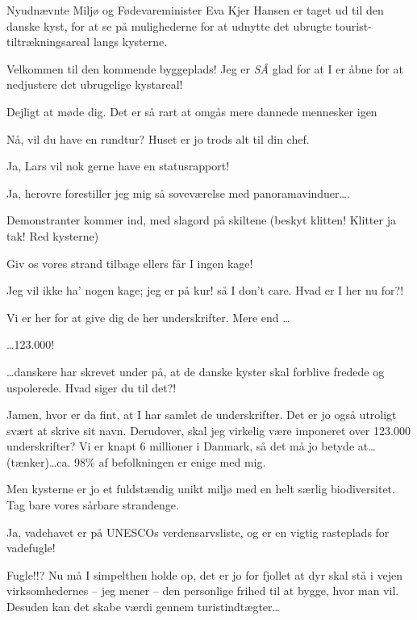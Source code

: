 \documentclass[a4paper,11pt]{article}
\begin{document}
\begin{sketch}


\scene Nyudnævnte Miljø og Fødevareminister Eva Kjer Hansen er taget ud til den danske kyst, for at se på mulighederne for at udnytte det ubrugte tourist-tiltrækningsareal langs kysterne.

 Velkommen til den kommende byggeplads! Jeg er \emph{SÅ} glad for at I er åbne for at nedjustere det ubrugelige kystareal!

 Dejligt at møde dig. Det er så rart at omgås mere dannede mennesker igen

 Nå, vil du have en rundtur? Huset er jo trods alt til din chef. 

 Ja, Lars vil nok gerne have en statusrapport! 

 Ja, herovre forestiller jeg mig så soveværelse med panoramavinduer\ldots. 

\scene Demonstranter kommer ind, med slagord på skiltene (beskyt klitten! Klitter ja tak! Red kysterne)

  Giv os vores strand tilbage ellers får I ingen kage!

 Jeg vil ikke ha' nogen kage; jeg er på kur! så I don't care. Hvad er I her nu for?!

  Vi er her for at give dig de her underskrifter. Mere end \ldots

 \ldots 123.000!

 \ldots danskere har skrevet under på, at de danske kyster skal forblive fredede og uspolerede. Hvad siger du til det?!

 Jamen, hvor er da fint, at I har samlet de underskrifter. Det er jo også utroligt svært at skrive sit navn. Derudover, skal jeg virkelig være imponeret over 123.000 underskrifter? Vi er knapt 6 millioner i Danmark, så det må jo betyde at\ldots (tænker)\ldots ca. 98\% af befolkningen er enige med mig. 

 Men kysterne er jo et fuldstændig unikt miljø med en helt særlig biodiversitet. Tag bare vores sårbare strandenge.

 Ja, vadehavet er på UNESCOs verdensarvsliste, og er en vigtig rasteplads for vadefugle!

 Fugle!!? Nu må I simpelthen holde op, det er jo for fjollet at dyr skal stå i vejen virksomhedernes -- jeg mener -- den personlige frihed til at bygge, hvor man vil. Desuden kan det skabe værdi gennem turistindtægter\ldots


\end{sketch}
\end{document}
